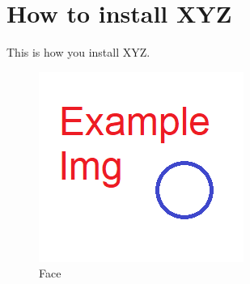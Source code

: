 \documentclass[
]{book}
\begin{document}
\hypertarget{how-to-install-xyz}{%
\chapter{How to install XYZ}\label{how-to-install-xyz}}

This is how you install XYZ.

\begin{figure}[H]

{\centering \includegraphics[width=0.75\linewidth]{articles/how-to-install-xyz/Example Graphic} 

}

\caption{Face}\label{fig:unnamed-chunk-7}
\end{figure}

  
\end{document}
